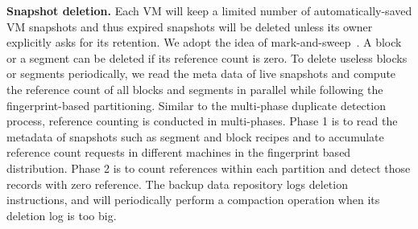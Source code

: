 {\bf Snapshot deletion.} Each VM will keep a limited number of  automatically-saved VM snapshots and thus
expired snapshots will be deleted unless its owner explicitly asks for its retention.
We adopt the idea of mark-and-sweep~\cite{MarkSweep}. 
A block or a segment can be deleted if its reference count is zero.
To delete useless  blocks or segments periodically, we read the meta data  of live 
snapshots and compute the reference count of all blocks and segments  in parallel
while following the fingerprint-based partitioning.
Similar to the multi-phase duplicate detection process, reference counting is conducted in multi-phases. 
Phase  1 is to read  the metadata of snapshots such as segment and block
recipes and  to accumulate  reference count requests in different machines  in the fingerprint based distribution.
Phase   2 is to count references within each partition and detect those records with zero 
reference. 
The backup  data repository logs deletion instructions,  and will periodically perform a compaction operation when 
its deletion log is too big. 




